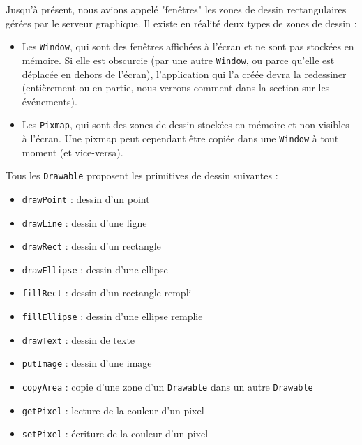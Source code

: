 Jusqu'à présent, nous avions appelé "fenêtres" les zones de dessin rectangulaires gérées par le serveur graphique. Il existe en réalité deux types de zones de dessin :
\begin{itemize}
  \item Les \verb|Window|, qui sont des fenêtres affichées à l'écran et ne sont pas stockées en mémoire. Si elle est obscurcie (par une autre \verb|Window|, ou parce qu'elle est déplacée en dehors de l'écran), l'application qui l'a créée devra la redessiner (entièrement ou en partie, nous verrons comment dans la section sur les événements).
  \item Les \verb|Pixmap|, qui sont des zones de dessin stockées en mémoire et non visibles à l'écran. Une pixmap peut cependant être copiée dans une \verb|Window| à tout moment (et vice-versa).
\end{itemize}

Tous les \verb|Drawable| proposent les primitives de dessin suivantes :
\begin{itemize}
  \item \verb|drawPoint| : dessin d'un point
  \item \verb|drawLine| : dessin d'une ligne
  \item \verb|drawRect| : dessin d'un rectangle
  \item \verb|drawEllipse| : dessin d'une ellipse
  \item \verb|fillRect| : dessin d'un rectangle rempli
  \item \verb|fillEllipse| : dessin d'une ellipse remplie
  \item \verb|drawText| : dessin de texte
  \item \verb|putImage| : dessin d'une image
  \item \verb|copyArea| : copie d'une zone d'un \verb|Drawable| dans un autre \verb|Drawable|
  \item \verb|getPixel| : lecture de la couleur d'un pixel
  \item \verb|setPixel| : écriture de la couleur d'un pixel
\end{itemize}

